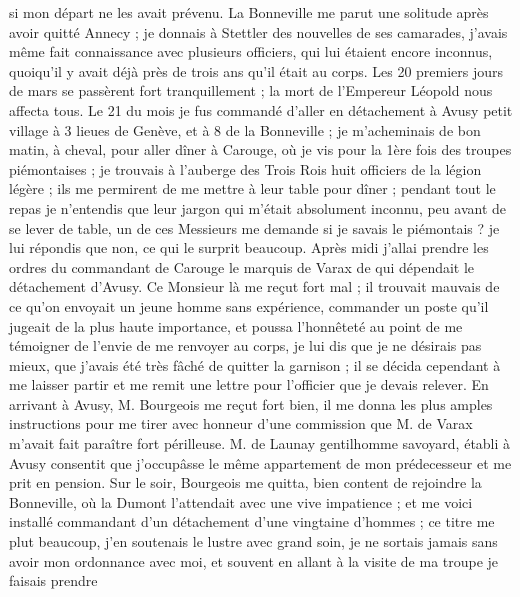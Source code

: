 \documentclass[12pt]{article}
\begin{document}
 si mon départ ne les avait prévenu. La Bonneville me
parut une solitude après avoir quitté Annecy ; je donnais à Stettler des nouvelles de ses camarades,
j’avais même fait connaissance avec plusieurs officiers, qui lui étaient encore inconnus, quoiqu’il
y avait déjà près de trois ans qu’il était au corps. Les 20 premiers jours de mars se passèrent fort
tranquillement ; la mort de l’Empereur Léopold nous affecta tous. Le 21 du mois je fus commandé
d’aller en détachement à Avusy petit village à 3 lieues de Genève, et à 8 de la Bonneville ; je
m’acheminais de bon matin, à cheval, pour aller dîner à Carouge, où je vis pour la 1ère fois des
troupes piémontaises ; je trouvais à l’auberge des Trois Rois huit officiers de la légion légère ;
ils me permirent de me mettre à leur table pour dîner ; pendant tout le repas je n’entendis que leur
jargon qui m’était absolument inconnu, peu avant de se lever de table, un de ces Messieurs me
demande si je savais le piémontais ? je lui répondis que non, ce qui le surprit beaucoup. Après midi
j’allai prendre les ordres du commandant de Carouge le marquis de Varax de qui dépendait le
détachement d’Avusy. Ce Monsieur là me reçut fort mal ; il trouvait mauvais de ce qu’on envoyait un
jeune homme sans expérience, commander un poste qu’il jugeait de la plus haute importance, et poussa
l’honnêteté au point de me témoigner de l’envie de me renvoyer au corps, je lui dis que je ne
désirais pas mieux, que j’avais été très fâché de quitter la garnison ; il se décida cependant à me
laisser partir et me remit une lettre pour l’officier que je devais relever. En arrivant à Avusy, M.
Bourgeois me reçut fort bien, il me donna les plus amples instructions pour me tirer avec honneur
d’une commission que M. de Varax m’avait fait paraître fort périlleuse. M. de Launay gentilhomme
savoyard, établi à Avusy consentit que j’occupâsse le même appartement de mon prédecesseur et me
prit en pension. Sur le soir, Bourgeois me quitta, bien content de rejoindre la Bonneville, où la
Dumont l’attendait avec une vive impatience ; et me voici installé commandant d’un détachement d’une
vingtaine d’hommes ; ce titre me plut beaucoup, j’en soutenais le lustre avec grand soin, je ne
sortais jamais sans avoir mon ordonnance avec moi, et souvent en allant à la visite de ma troupe je
faisais prendre
\end{document}
